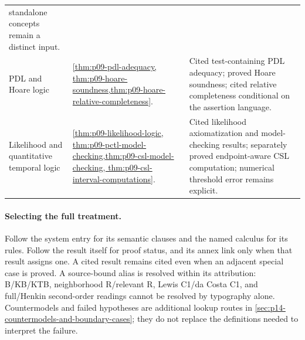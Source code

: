 \begin{longtable}{@{}p{}p{}p{}@{}}
standalone concepts remain a distinct input.\\\addlinespace
PDL and Hoare logic & \cref{thm:p09-pdl-adequacy,
thm:p09-hoare-soundness,thm:p09-hoare-relative-completeness}. & Cited
test-containing PDL adequacy; proved Hoare soundness; cited relative
completeness conditional on the assertion language.\\\addlinespace
Likelihood and quantitative temporal logic & \cref{thm:p09-likelihood-logic,
thm:p09-pctl-model-checking,thm:p09-csl-model-checking,
thm:p09-csl-interval-computations}. & Cited likelihood axiomatization and
model-checking results; separately proved endpoint-aware CSL computation;
numerical threshold error remains explicit.\\
\end{longtable}

\paragraph{Selecting the full treatment.}
Follow the system entry for its semantic clauses and the named calculus for
its rules. Follow the result itself for proof status, and its annex link only
when that result assigns one. A cited result remains cited even when an
adjacent special case is proved. A source-bound alias is resolved within its
attribution: B/KB/KTB, neighborhood R/relevant R, Lewis C1/da Costa C1,
and full/Henkin second-order readings cannot be resolved by typography alone.
Countermodels and failed hypotheses are additional lookup routes in
\cref{sec:p14-countermodels-and-boundary-cases}; they do not replace the
definitions needed to interpret the failure.
